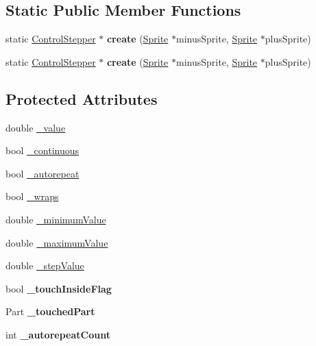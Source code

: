\subsection*{Static Public Member Functions}
\begin{DoxyCompactItemize}
\item 
\mbox{\label{classControlStepper_a2c6ef032414c6420b4b0c6f05b72a51a}} 
static \hyperlink{classControlStepper}{Control\+Stepper} $\ast$ {\bfseries create} (\hyperlink{classSprite}{Sprite} $\ast$minus\+Sprite, \hyperlink{classSprite}{Sprite} $\ast$plus\+Sprite)
\item 
\mbox{\label{classControlStepper_a7f3f7e7b68221ceb1841be7204ef4bf3}} 
static \hyperlink{classControlStepper}{Control\+Stepper} $\ast$ {\bfseries create} (\hyperlink{classSprite}{Sprite} $\ast$minus\+Sprite, \hyperlink{classSprite}{Sprite} $\ast$plus\+Sprite)
\end{DoxyCompactItemize}
\subsection*{Protected Attributes}
\begin{DoxyCompactItemize}
\item 
double \hyperlink{classControlStepper_a2d84d49ad6381e57e353b2e6cd2fafd5}{\+\_\+value}
\item 
bool \hyperlink{classControlStepper_a719913d4a3b9a5547c667ea59acce5e1}{\+\_\+continuous}
\item 
bool \hyperlink{classControlStepper_ac0170ab1141a829cade54f76fe71a2cf}{\+\_\+autorepeat}
\item 
bool \hyperlink{classControlStepper_af7d9b1a82342df805f6d3bb90faa6ac1}{\+\_\+wraps}
\item 
double \hyperlink{classControlStepper_a1c69d0db7f0821cb798b355a2d4d71bf}{\+\_\+minimum\+Value}
\item 
double \hyperlink{classControlStepper_a3032c6b015481de0651f425d67a0c920}{\+\_\+maximum\+Value}
\item 
double \hyperlink{classControlStepper_a7b5f96355831685a8c9992e018e55e62}{\+\_\+step\+Value}
\item 
\mbox{\label{classControlStepper_abe098b01914e0e69fb13b03dea8edfd9}} 
bool {\bfseries \+\_\+touch\+Inside\+Flag}
\item 
\mbox{\label{classControlStepper_af2fae866b7ddd38a2fe0f39219013cfd}} 
Part {\bfseries \+\_\+touched\+Part}
\item 
\mbox{\label{classControlStepper_a621729fe4a45da6f3e9ade2bc10bbf5e}} 
int {\bfseries \+\_\+autorepeat\+Count}
\end{DoxyCompactItemize}

